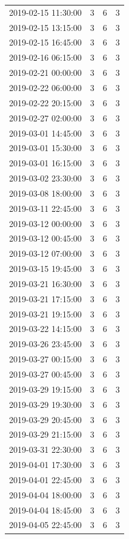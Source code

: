 \begin{tabular}{lrrr}
2019-02-15 11:30:00 & 3 & 6 & 3 \\
2019-02-15 13:15:00 & 3 & 6 & 3 \\
2019-02-15 16:45:00 & 3 & 6 & 3 \\
2019-02-16 06:15:00 & 3 & 6 & 3 \\
2019-02-21 00:00:00 & 3 & 6 & 3 \\
2019-02-22 06:00:00 & 3 & 6 & 3 \\
2019-02-22 20:15:00 & 3 & 6 & 3 \\
2019-02-27 02:00:00 & 3 & 6 & 3 \\
2019-03-01 14:45:00 & 3 & 6 & 3 \\
2019-03-01 15:30:00 & 3 & 6 & 3 \\
2019-03-01 16:15:00 & 3 & 6 & 3 \\
2019-03-02 23:30:00 & 3 & 6 & 3 \\
2019-03-08 18:00:00 & 3 & 6 & 3 \\
2019-03-11 22:45:00 & 3 & 6 & 3 \\
2019-03-12 00:00:00 & 3 & 6 & 3 \\
2019-03-12 00:45:00 & 3 & 6 & 3 \\
2019-03-12 07:00:00 & 3 & 6 & 3 \\
2019-03-15 19:45:00 & 3 & 6 & 3 \\
2019-03-21 16:30:00 & 3 & 6 & 3 \\
2019-03-21 17:15:00 & 3 & 6 & 3 \\
2019-03-21 19:15:00 & 3 & 6 & 3 \\
2019-03-22 14:15:00 & 3 & 6 & 3 \\
2019-03-26 23:45:00 & 3 & 6 & 3 \\
2019-03-27 00:15:00 & 3 & 6 & 3 \\
2019-03-27 00:45:00 & 3 & 6 & 3 \\
2019-03-29 19:15:00 & 3 & 6 & 3 \\
2019-03-29 19:30:00 & 3 & 6 & 3 \\
2019-03-29 20:45:00 & 3 & 6 & 3 \\
2019-03-29 21:15:00 & 3 & 6 & 3 \\
2019-03-31 22:30:00 & 3 & 6 & 3 \\
2019-04-01 17:30:00 & 3 & 6 & 3 \\
2019-04-01 22:45:00 & 3 & 6 & 3 \\
2019-04-04 18:00:00 & 3 & 6 & 3 \\
2019-04-04 18:45:00 & 3 & 6 & 3 \\
2019-04-05 22:45:00 & 3 & 6 & 3 \\

\end{tabular}
